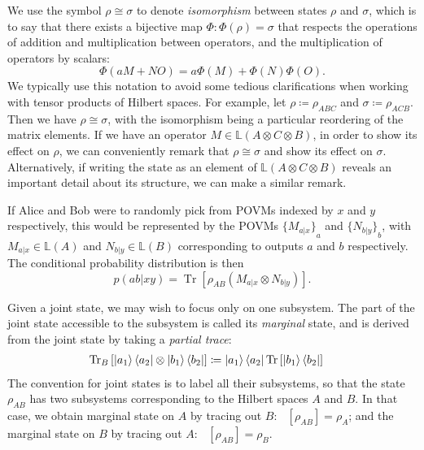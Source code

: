\documentclass[10pt, a4paper]{article}
\numberwithin{equation}{section} %
\theoremstyle{definition}
\theoremstyle{plain}
\newcommand{\?}{\mathrel{?}} %
\newcommand{\Lin}[1]{\mathbb{L}\left(#1\right)}
\newcommand{\Tr}[2][]{\mathop{\mathrm{Tr}#1}\left[ #2 \right]} %
\begin{document}
\begin{appendices}
                          We use the symbol \(\rho \cong \sigma\) to denote \emph{isomorphism} between states \(\rho\) and \(\sigma\), which is to say that there exists a bijective map \(\Phi : \Phi(\rho) = \sigma\) that respects the operations of addition and multiplication between operators, and the multiplication of operators by scalars:
                          \begin{equation}
                            \Phi(aM + NO) = a\Phi(M) + \Phi(N)\Phi(O).
                          \end{equation}
                          We typically use this notation to avoid some tedious clarifications when working with tensor products of Hilbert spaces. For example, let \(\rho \coloneqq \rho_{ABC}\) and \(\sigma \coloneqq \rho_{ACB}\). Then we have \(\rho \cong \sigma\), with the isomorphism being a particular reordering of the matrix elements. If we have an operator \(M \in \Lin{A \otimes C \otimes B}\), in order to show its effect on \(\rho\), we can conveniently remark that \(\rho \cong \sigma\) and show its effect on \(\sigma\). Alternatively, if writing the state as an element of \(\Lin{A \otimes C \otimes B}\) reveals an important detail about its structure, we can make a similar remark.

                          If Alice and Bob were to randomly pick from POVMs indexed by \(x\) and \(y\) respectively, this would be represented by the POVMs \({\{M_{a|x}\}}_a\) and \({\{N_{b|y}\}}_b\), with \(M_{a|x} \in \Lin{A}\) and \(N_{b|y} \in \Lin{B}\) corresponding to outputs \(a\) and \(b\) respectively. The conditional probability distribution is then
                          \begin{equation}
                            p(ab|xy) = \Tr{\rho_{AB} \left(M_{a|x} \otimes N_{b|y}\right) }.
                          \end{equation}

                          Given a joint state, we may wish to focus only on one subsystem. The part of the joint state accessible to the subsystem is called its \emph{marginal} state, and is derived from the joint state by taking a \emph{partial trace}:
                          \begin{align}
                            \Tr[_B]{\ket{a_1}\bra{a_2} \otimes \ket{b_1}\bra{b_2}} &\coloneqq \ket{a_1}\bra{a_2} \Tr{\ket{b_1}\bra{b_2}}
                          \end{align}
                          The convention for joint states is to label all their subsystems, so that the state \(\rho_{AB}\) has two subsystems corresponding to the Hilbert spaces \(A\) and \(B\). In that case, we obtain marginal state on \(A\) by tracing out \(B\): \(\Tr[_B]{\rho_{AB}} = \rho_{A}\); and the marginal state on \(B\) by tracing out \(A\): \(\Tr[_A]{\rho_{AB}} = \rho_{B}\).


\end{appendices}
\end{document}

